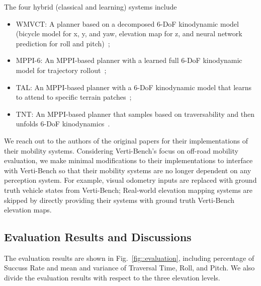 The four hybrid (classical and learning) systems include

\begin{itemize}
    \item WMVCT: A planner based on a decomposed 6-DoF kinodynamic model (bicycle model for x, y, and yaw, elevation map for z, and neural network prediction for roll and pitch)~\cite{datar2024learning};
    \item MPPI-6: An MPPI-based planner with a learned full 6-DoF kinodynamic model for trajectory rollout~\cite{lee2023learning};
    \item TAL: An MPPI-based planner with a 6-DoF kinodynamic model that learns to attend to specific terrain patches~\cite{datar2024terrain};
    \item TNT: An MPPI-based planner that samples based on traversability and then unfolds 6-DoF kinodynamics~\cite{pan2024traverse}.
\end{itemize}
We reach out to the authors of the original papers for their implementations of their mobility systems. Considering Verti-Bench's focus on off-road mobility evaluation, we make minimal modifications to their implementations to interface with Verti-Bench so that their mobility systems are no longer dependent on any perception system. For example, visual odometry inputs are replaced with ground truth vehicle states from Verti-Bench; Real-world elevation mapping systems are skipped by directly providing their systems with ground truth Verti-Bench elevation maps. 

\subsection{Evaluation Results and Discussions}

The evaluation results are shown in Fig.~\ref{fig::evaluation}, including percentage of Succuss Rate and mean and variance of Traversal Time, Roll, and Pitch. We also divide the evaluation results with respect to the three elevation levels. 

